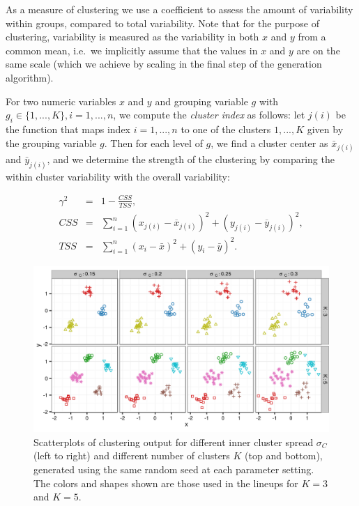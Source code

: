 \documentclass[11pt]{isuthesis}\usepackage[]{graphicx}\usepackage[]{color}
\newenvironment{knitrout}{}{} %
\begin{document}
As a measure of clustering we use a coefficient to assess the amount of variability within groups, compared to total variability. Note that for the purpose of clustering, variability is measured as the variability in both $x$ and $y$ from a common mean, i.e.\ we implicitly assume that the values in $x$ and $y$ are on the same scale (which we achieve by scaling in the final step of the generation algorithm).

For two numeric variables $x$ and $y$ and grouping variable $g$ with $g_i \in \{1, ..., K\}, i = 1, ..., n$, we compute the  {\it cluster index} as follows: let $j(i)$ be the function that maps index $i = 1, ..., n$ to one of the clusters $1, ..., K$ given by the grouping variable $g$. Then for each  level of $g$, we find  a cluster center as $\bar{x}_{j(i)}$ and  $\bar{y}_{j(i)}$, and we determine the strength of the clustering by comparing the within cluster variability with the overall variability: 

\begin{eqnarray}\label{eq:clusterMeasure}
\gamma^2 &=& 1 - \frac{CSS}{TSS},\\
\nonumber CSS &=& \sum_{i=1}^n \left(x_{j(i)} - \overline{x}_{j(i)}\right)^2 + \left(y_{j(i)} - \overline{y}_{j(i)} \right)^2, \\
\nonumber TSS &=& \sum_{i=1}^n \left(x_i - \bar{x}\right)^2 + \left(y_i - \bar{y}\right)^2.
\end{eqnarray}

\begin{figure}[ht]
\begin{knitrout}
\color{fgcolor}

{\centering \includegraphics[width=\linewidth]{Figure/FeatureHierarchy/fig-cluster-1} 

}



\end{knitrout}
\caption[Parameters affecting $M_C$]{\label{fig:clusters} Scatterplots of clustering output for different inner cluster spread $\sigma_C$  (left to right) and different number of clusters $K$ (top and bottom), generated using the same random seed at each parameter setting. The colors and shapes shown are those used in the lineups for $K=3$ and $K=5$.}
\end{figure}
\end{document}
